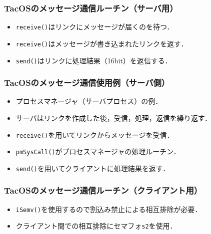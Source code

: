 \documentclass[unicode,handout]{beamer}                   %
\begin{document}
\begin{frame}
  \frametitle{TacOSのメッセージ通信ルーチン（サーバ用）}
  \begin{itemize}
  \item {\tt receive()}はリンクにメッセージが届くのを待つ．
  \item {\tt receive()}はメッセージが書き込まれたリンクを返す．
  \item {\tt send()}はリンクに処理結果（16bit）を返信する．
  \end{itemize}
\end{frame}

\begin{frame}
  \frametitle{TacOSのメッセージ通信使用例（サーバ側）}
  \begin{itemize}
  \item プロセスマネージャ（サーバプロセス）の例．
  \item サーバはリンクを作成した後，受信，処理，返信を繰り返す．
  \item {\tt receive()}を用いてリンクからメッセージを受信．
  \item {\tt pmSysCall()}がプロセスマネージャの処理ルーチン．
  \item {\tt send()}を用いてクライアントに処理結果を返す．
  \end{itemize}
\end{frame}

\begin{frame}
  \frametitle{TacOSのメッセージ通信ルーチン（クライアント用）}
  \begin{itemize}
  \item {\tt iSemv()}を使用するので割込み禁止による相互排除が必要．
  \item クライアント間での相互排除にセマフォ{\tt s2}を使用．
  \end{itemize}
\end{frame}
\end{document}
